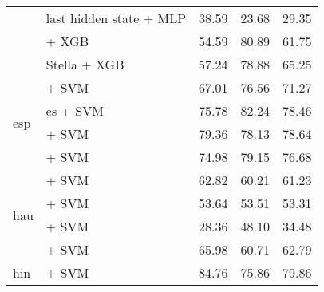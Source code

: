\begin{longtable}{llccc}
                                       & \citep{DBLP:journals/corr/abs-1911-02116} last hidden state + MLP  & 38.59                                & 23.68              & 29.35             \\
                                       & \citep{lee2024nv} + XGB                                            & 54.59                                & 80.89              & 61.75             \\
                                       & \citep{zhang2025jasperstelladistillationsota} Stella + XGB         & 57.24                                & 78.88              & 65.25             \\
    \midrule
    \multirow{4}{*}{esp}               & \citep{CaneteCFP2020}  + SVM                                       & 67.01                                & 76.56              & 71.27             \\
                                       & \citep{mohr2024multi} es + SVM                                     & 75.78                                & 82.24              & 78.46             \\
                                       & \citep{sturua2024jinaembeddingsv3multilingualembeddingstask} + SVM & 79.36                                & 78.13              & 78.64             \\
                                       & \citep{romero2023multilinguale5largeftstsspanish} + SVM            & 74.98                                & 79.15              & 76.68             \\
    \midrule
    \multirow{4}{*}{hau}               & \citep{wang2024multilingual}  + SVM                                & 62.82                                & 60.21              & 61.23             \\
                                       & \citep{sturua2024jinaembeddingsv3multilingualembeddingstask} + SVM & 53.64                                & 53.51              & 53.31             \\
                                       & \citep{oketunji2024pmmlv2finetunedhausa} + SVM                     & 28.36                                & 48.10              & 34.48             \\
                                       & \citep{dobler-demelo-2023-focus} + SVM                             & 65.98                                & 60.71              & 62.79             \\
    \midrule
    \multirow{5}{*}{hin}               & \citep{sukhlecha_2024_bhasha_embed_v0} + SVM                       & 84.76                                & 75.86              & 79.86             \\

\end{longtable}
